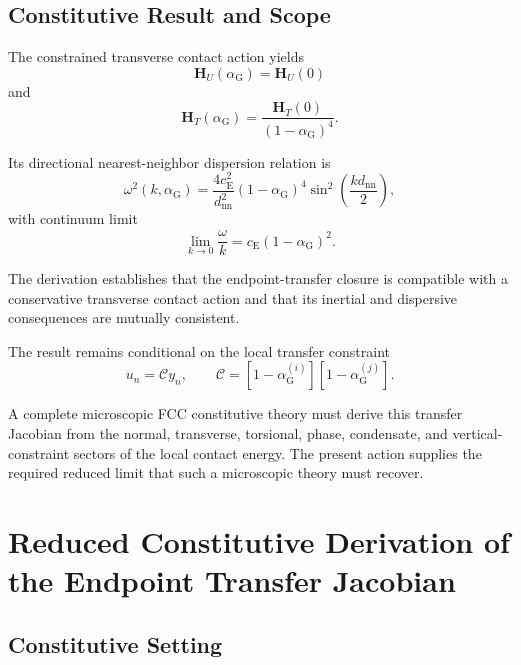 \subsection{Constitutive Result and Scope}

The constrained transverse contact action yields
\begin{equation}
    \boxed{ \mathbf{H}_U(\alpha_{\mathrm{G}}) = \mathbf{H}_U(0) }
\end{equation}
and
\begin{equation}
    \boxed{ \mathbf{H}_T(\alpha_{\mathrm{G}}) = \frac{\mathbf{H}_T(0)}{ \left( 1-\alpha_{\mathrm{G}} \right)^4 } }.
\end{equation}

Its directional nearest-neighbor dispersion relation is
\begin{equation}
    \boxed{ \omega^2(k,\alpha_{\mathrm{G}}) = \frac{4c_{\mathrm{E}}^2}{d_{\mathrm{nn}}^2} \left( 1-\alpha_{\mathrm{G}} \right)^4 \sin^2 \left( \frac{kd_{\mathrm{nn}}}{2} \right) },
\end{equation}
with continuum limit
\begin{equation}
    \boxed{ \lim_{k\rightarrow 0} \frac{\omega}{k} = c_{\mathrm{E}} \left( 1-\alpha_{\mathrm{G}} \right)^2 }.
\end{equation}

The derivation establishes that the endpoint-transfer closure is compatible with a conservative transverse contact action and that its inertial and dispersive consequences are mutually consistent.

The result remains conditional on the local transfer constraint
\begin{equation}
    u_n = \mathcal{C} y_n, \qquad \mathcal{C} = \left[ 1-\alpha_{\mathrm{G}}^{(i)} \right] \left[ 1-\alpha_{\mathrm{G}}^{(j)} \right].
\end{equation}

A complete microscopic FCC constitutive theory must derive this transfer Jacobian from the normal, transverse, torsional, phase, condensate, and vertical-constraint sectors of the local contact energy. The present action supplies the required reduced limit that such a microscopic theory must recover.

\section{Reduced Constitutive Derivation of the Endpoint Transfer Jacobian}

\subsection{Constitutive Setting}

